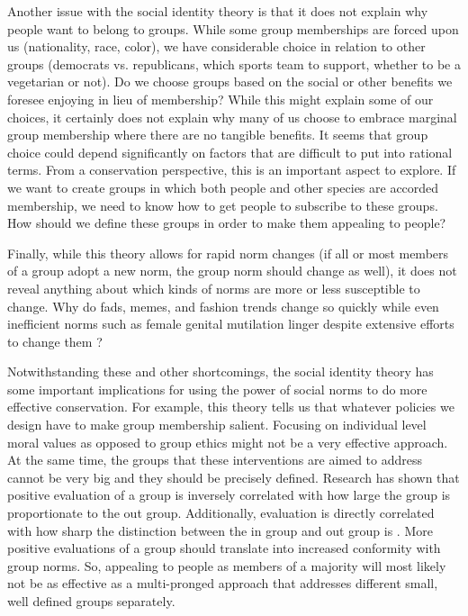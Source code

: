 \documentclass[rutwik_proposal.tex]{subfiles}
\begin{document}
Another issue with the social identity theory is that it does not explain why people want to belong to groups. While some group memberships are forced upon us (nationality, race, color), we have considerable choice in relation to other groups (democrats vs. republicans, which sports team to support, whether to be a vegetarian or not). Do we choose groups based on the social or other benefits we foresee enjoying in lieu of membership? While this might explain some of our choices, it certainly does not explain why many of us choose to embrace marginal group membership where there are no tangible benefits. It seems that group choice could depend significantly on factors that are difficult to put into rational terms. From a conservation perspective, this is an important aspect to explore. If we want to create groups in which both people and other species are accorded membership, we need to know how to get people to subscribe to these groups. How should we define these groups in order to make them appealing to people?

Finally, while this theory allows for rapid norm changes (if all or most members of a group adopt a new norm, the group norm should change as well), it does not reveal anything about which kinds of norms are more or less susceptible to change. Why do fads, memes, and fashion trends change so quickly while even inefficient norms such as female genital mutilation linger despite extensive efforts to change them \cite{Mackie96, Shell-Duncan00}?

Notwithstanding these and other shortcomings, the social identity theory has some important implications for using the power of social norms to do more effective conservation. For example, this theory tells us that whatever policies we design have to make group membership salient. Focusing on individual level moral values as opposed to group ethics might not be a very effective approach. At the same time, the groups that these interventions are aimed to address cannot be very big and they should be precisely defined. Research has shown that positive evaluation of a group is inversely correlated with how large the group is proportionate to the out group. Additionally, evaluation is directly correlated with how sharp the distinction between the in group and out group is \cite{Mullen92}. More positive evaluations of a group should translate into increased conformity with group norms. So, appealing to people as members of a majority will most likely not be as effective as a multi-pronged approach that addresses different small, well defined groups separately.
\end{document}
